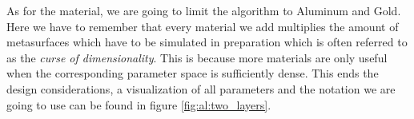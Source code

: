 As for the material, we are going to limit the algorithm to Aluminum and Gold. Here we have to remember that every material we add multiplies the amount of metasurfaces which have to be simulated in preparation which is often referred to as the \textit{curse of dimensionality}. This is because more materials are only useful when the corresponding parameter space is sufficiently dense. This ends the design considerations, a visualization of all parameters and the notation we are going to use can be found in figure \ref{fig:al:two_layers}.
